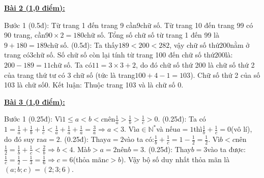 \documentclass[11pt,a4paper]{article}
\begin{document}
\noindent\textbf{\underline{Bài 2 (1,0 điểm):}}\par\vspace{3pt}
Bước 1 (0.5đ): Từ trang 1 đến trang 9 cần$9$chữ số. Từ trang 10 đến trang 99 có 90 trang, cần$90 \times 2 = 180$chữ số. Tổng số chữ số từ trang 1 đến 99 là$9 + 180 = 189$chữ số. (0.5đ): Ta thấy$189 < 200 < 282$, vậy chữ số thứ$200$nằm ở trang có$3$chữ số. Số chữ số còn lại tính từ trang 100 đến chữ số thứ$200$là:$200 - 189 = 11$chữ số. Ta có$11 = 3 \times 3 + 2$, do đó chữ số thứ 200 là chữ số thứ 2 của trang thứ tư có 3 chữ số (tức là trang$100 + 4 - 1 = 103$). Chữ số thứ 2 của số 103 là chữ số$0$. Kết luận: Thuộc trang 103 và là chữ số 0.\par\vspace{8pt}

\noindent\textbf{\underline{Bài 3 (1,0 điểm):}}\par\vspace{3pt}
Bước 1 (0.25đ): Vì$1 \le a < b < c$nên$\frac{1}{a} > \frac{1}{b} > \frac{1}{c} > 0$. (0.25đ): Ta có$1 = \frac{1}{a} + \frac{1}{b} + \frac{1}{c} < \frac{1}{a} + \frac{1}{a} + \frac{1}{a} = \frac{3}{a} \Rightarrow a < 3$. Vì$a \in \mathbb{N}^*$và nếu$a = 1$thì$\frac{1}{b} + \frac{1}{c} = 0$(vô lí), do đó suy ra$a = 2$. (0.25đ): Thay$a = 2$vào ta có:$\frac{1}{b} + \frac{1}{c} = 1 - \frac{1}{2} = \frac{1}{2}$. Vì$b < c$nên$\frac{1}{2} = \frac{1}{b} + \frac{1}{c} < \frac{2}{b} \Rightarrow b < 4$. Mà$b > a = 2$nên$b = 3$. (0.25đ): Thay$b = 3$vào ta được:$\frac{1}{c} = \frac{1}{2} - \frac{1}{3} = \frac{1}{6} \Rightarrow c = 6$(thỏa mãn$c > b$). Vậy bộ số duy nhất thỏa mãn là$(a; b; c) = (2; 3; 6)$.\par\vspace{8pt}
\end{document}
